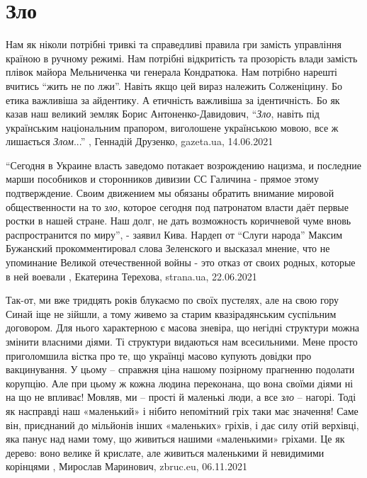  
 
 
 
 
\chapter{Зло}
\label{sec:slova.zlo}

Нам як ніколи потрібні тривкі та справедливі правила гри замість управління
країною в ручному режимі. Нам потрібні відкритість та прозорість влади замість
плівок майора Мельниченка чи генерала Кондратюка. Нам потрібно нарешті вчитись
\enquote{жить не по лжи}. Навіть якщо цей вираз належить Солженіцину. Бо етика
важливіша за айдентику. А етичність важливіша за ідентичність. Бо як казав наш
великий земляк Борис Антоненко-Давидович, \enquote{\emph{Зло}, навіть під українським
національним прапором, виголошене українською мовою, все ж лишається \emph{Злом}...}
, 
Геннадій Друзенко, gazeta.ua, 14.06.2021

\enquote{Сегодня в Украине власть заведомо потакает возрождению нацизма, и последние
марши пособников и сторонников дивизии СС Галичина - прямое этому
подтверждение. Своим движением мы обязаны обратить внимание мировой
общественности на то \emph{зло}, которое сегодня под патронатом власти даёт первые
ростки в нашей стране. Наш долг, не дать возможность коричневой чуме вновь
распространится по миру}, - заявил Кива.  Нардеп от \enquote{Слуги народа} Максим
Бужанский прокомментировал слова Зеленского  и высказал мнение, что не
упоминание Великой отечественной войны - это отказ от своих родных, которые в
ней воевали
, Екатерина Терехова, strana.ua, 22.06.2021

Так-от, ми вже тридцять років блукаємо по своїх пустелях, але на свою гору
Синай іще не зійшли, а тому живемо за старим квазірадянським суспільним
договором. Для нього характерною є масова зневіра, що негідні структури  можна
змінити власними діями. Ті структури видаються нам всесильними. Мене просто
приголомшила вістка про те, що українці масово купують довідки про
вакцинування. У цьому – справжня ціна нашому позірному прагненню подолати
корупцію. Але при цьому ж кожна людина переконана, що вона своїми діями ні на
що не впливає! Мовляв, ми – прості й маленькі люди, а все \emph{зло} – нагорі. Тоді як
насправді наш «маленький» і нібито непомітний гріх таки має значення! Саме він,
приєднаний до мільйонів інших «маленьких» гріхів, і дає силу отій верхівці, яка
панує над нами тому, що живиться нашими «маленькими» гріхами. Це як дерево:
воно велике й крислате, але живиться маленькими й невидимими корінцями
, 
Мирослав Маринович, zbruc.eu, 06.11.2021
